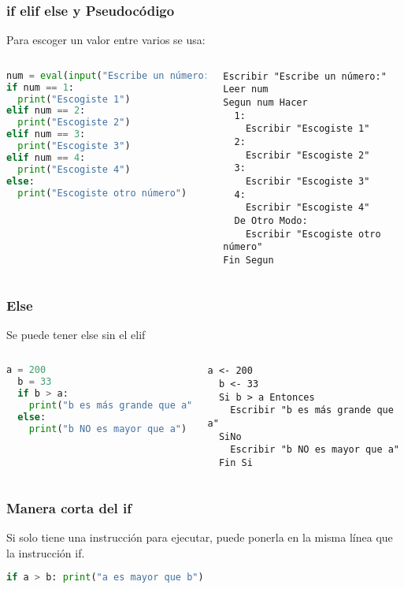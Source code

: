 \begin{frame}[fragile]
  \frametitle{if elif else y Pseudocódigo}

  Para escoger un valor entre varios se usa:
  \begin{columns}
      \begin{lstlisting}[language=Python]
num = eval(input("Escribe un número: "))
if num == 1:
  print("Escogiste 1")
elif num == 2:
  print("Escogiste 2")
elif num == 3:
  print("Escogiste 3")
elif num == 4:
  print("Escogiste 4")
else:
  print("Escogiste otro número")
      \end{lstlisting}
    \pausa
      \begin{lstlisting}[style=pseudocodigo]
Escribir "Escribe un número:"
Leer num
Segun num Hacer
  1:
    Escribir "Escogiste 1"
  2:
    Escribir "Escogiste 2"
  3:
    Escribir "Escogiste 3"
  4:
    Escribir "Escogiste 4"
  De Otro Modo:
    Escribir "Escogiste otro número"
Fin Segun
      \end{lstlisting}
  \end{columns}
\end{frame}

\begin{frame}[fragile]
  \frametitle{Else}

  Se puede tener \textcolor{codeKeyword}{else} sin el
  \textcolor{codeKeyword}{elif}

  \begin{columns}
      \begin{lstlisting}[language=Python]
  a = 200
  b = 33
  if b > a:
    print("b es más grande que a")
  else:
    print("b NO es mayor que a")
      \end{lstlisting}
    \pausa
      \begin{lstlisting}[style=pseudocodigo]
  a <- 200
  b <- 33
  Si b > a Entonces
    Escribir "b es más grande que a"
  SiNo
    Escribir "b NO es mayor que a"
  Fin Si
      \end{lstlisting}
  \end{columns}
\end{frame}

\begin{frame}[fragile]
  \frametitle{Manera corta del if}

  Si solo tiene una instrucción para ejecutar, puede ponerla en la misma
  línea que la instrucción if.

  \vspace{\baselineskip}
  \begin{lstlisting}[language=Python]
  if a > b: print("a es mayor que b")
  \end{lstlisting}
\end{frame}

